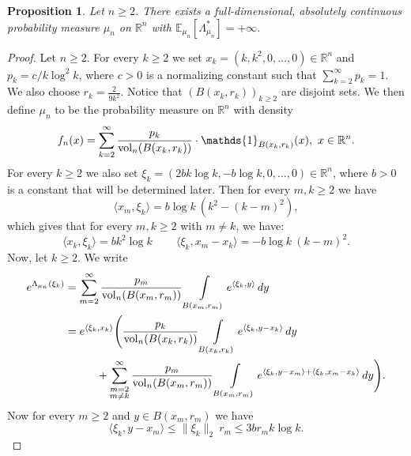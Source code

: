 \documentclass[11pt,a4paper]{article} %
\newtheorem{proposition}[theorem]{Proposition}
\theoremstyle{definition}
\theoremstyle{remark}
\newcommand{\1}{\mathds{1}}
\newcommand{\vol}{{\rm{vol}}}
\begin{document}
\begin{proposition}
    Let $n \geq 2$. There exists a full-dimensional, absolutely continuous probability measure $\mu_n$ on $\mathbb{R}^n$ with $\mathbb{E}_{\mu_n}[\Lambda_{\mu_n}^\ast]=+\infty.$
\end{proposition}

\begin{proof}
Let $n \geq 2$. For every $k \geq 2$ we set $x_k=(k,k^2,0,\ldots,0) \in \mathbb{R}^n$ and $p_k=c/k\log^2k$, where $c>0$ is a normalizing constant such that $\sum_{k=2}^{\infty}p_k=1$. We also choose $r_k=\frac{2}{9k^2}$. Notice that $(B(x_k,r_k))_{k \geq 2}$ are disjoint sets.  We then define $\mu_n$ to be the probability measure on $\mathbb{R}^n$ with density $$f_n(x)=\sum\limits_{k=2}^{\infty} \frac{p_k}{\vol_n(B(x_k,r_k))} \cdot \mathds{1}_{B(x_k,r_k)}(x), \ x\in \mathbb{R}^n.$$
For every $k \geq 2$ we also set $\xi_k=(2bk\log k,-b\log k,0, \ldots, 0) \in \mathbb{R}^n$, where $b>0$ is a constant that will be determined later. Then for every $m,k \geq 2$ we have
$$\langle x_m,\xi_k \rangle=b\log k \ (k^2-(k-m)^2),$$ which gives that for every $m,k\geq 2$ with $m \neq k$, we have: \begin{equation}\label{eq:equation1}
\langle x_k,\xi_k \rangle=b k^2 \log k \, \qquad \langle \xi_k, x_m-x_k \rangle =-b \log k \ (k-m)^2.
\end{equation}
Now, let $k \geq 2 $. We write
\begin{equation}\label{eq:equation2}
\begin{aligned} e^{\Lambda_{\mu_n}(\xi_k)} &= \sum\limits_{m=2}^{\infty} \frac{p_m}{\vol_n(B(x_m,r_m))}\int\limits_{B(x_m,r_m)} e^{ \langle \xi_k,y\rangle } \, dy \\
&= e^{ \langle \xi_k,x_k \rangle } \Bigg(\frac{p_k}{\vol_n(B(x_k,r_k))} \int\limits_{B(x_k,r_k)} e^{ \langle \xi_k,y- x_k\rangle } \, dy \\ &\hspace{1cm}+\sum\limits_{\substack{m=2 \\ m \neq k}}^{\infty} \frac{p_m}{\vol_n(B(x_m,r_m))} \int\limits_{B(x_m,r_m)} e^{ \langle \xi_k,y- x_m\rangle + \langle \xi_k,x_m- x_k\rangle} \, dy \Bigg).
\end{aligned}
\end{equation}
Now for every $m \geq 2$ and $y \in B(x_m,r_m) $ we have \begin{equation}\label{eq:equation3} 
\langle \xi_k,y-x_m \rangle \leq \|\xi_k\|_2 \ r_m \leq 3b r_m k\log k.
\end{equation}

\end{proof}
\end{document}
